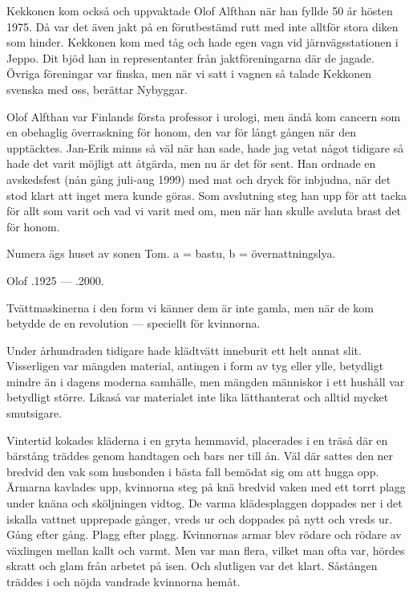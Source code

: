 Kekkonen kom också och uppvaktade Olof Alfthan när han fyllde 50 	år hösten 1975. Då var det även jakt på en förutbestämd rutt med inte alltför stora diken som hinder. Kekkonen kom med tåg och hade egen vagn vid järnvägsstationen i Jeppo. Dit bjöd han in representanter från jaktföreningarna där de jagade. Övriga föreningar var finska, men när vi satt i vagnen så talade Kekkonen svenska med oss, berättar Nybyggar.

Olof Alfthan var Finlands första professor i urologi, men ändå kom cancern som en obehaglig överraskning för honom, den var för långt gången när den upptäcktes. Jan-Erik minns så väl när han sade, hade jag vetat något tidigare så hade det varit möjligt att åtgärda, men nu är det för sent. Han ordnade en avskedsfest (nån gång juli-aug 1999) med mat och dryck för inbjudna, när det stod klart att inget mera kunde göras. Som avslutning steg han upp för att tacka för allt som 	varit och vad vi varit med om, men när han skulle avsluta brast det för honom.

Numera ägs huset av sonen Tom. a = bastu, b = övernattningslya.

Olof .1925 --- .2000.






Tvättmaskinerna i den form vi känner dem är inte gamla, men när de kom betydde de en revolution --- speciellt för kvinnorna.

Under århundraden tidigare hade klädtvätt inneburit ett helt annat slit. Visserligen var mängden material, antingen i form av tyg eller ylle, betydligt mindre än i dagens moderna samhälle, men mängden människor i ett hushåll var betydligt större. Likaså var materialet inte lika lätthanterat och alltid mycket smutsigare.

Vintertid kokades kläderna  i en gryta hemmavid, placerades i en träså där en bärstång träddes genom handtagen och bars ner till ån. Väl där sattes den ner bredvid den vak som husbonden i bästa fall bemödat sig om att hugga opp. Ärmarna kavlades upp, kvinnorna steg på knä bredvid vaken med ett torrt plagg under knäna och sköljningen vidtog. De varma klädesplaggen doppades ner i det iskalla vattnet upprepade gånger, vreds ur och doppades på nytt och vreds ur. Gång efter gång. Plagg efter plagg. Kvinnornas armar blev rödare och rödare av växlingen mellan kallt och varmt. Men var man flera, vilket man ofta var, hördes skratt och glam från arbetet på isen. Och slutligen var det klart. Såstången träddes i och nöjda vandrade kvinnorna hemåt.

